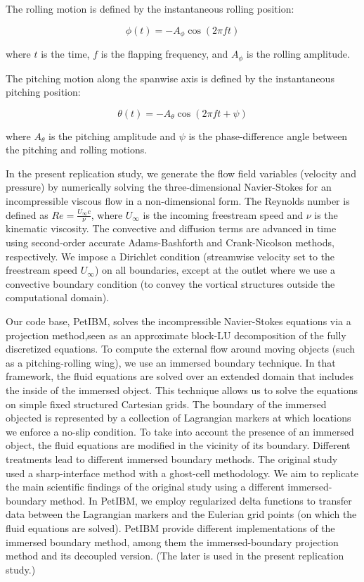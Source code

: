 The rolling motion is defined by the instantaneous rolling position:

\begin{equation}
  \phi (t) = -A_\phi \cos \left( 2 \pi f t \right)
\end{equation}

where $t$ is the time, $f$ is the flapping frequency, and $A_\phi$ is the rolling amplitude.

The pitching motion along the spanwise axis is defined by the instantaneous pitching position:

\begin{equation}
  \theta (t) = -A_\theta \cos(2 \pi f t + \psi)
\end{equation}

where $A_\theta$ is the pitching amplitude and $\psi$ is the phase-difference angle between the pitching and rolling motions.

In the present replication study, we generate the flow field variables (velocity and pressure) by numerically solving the three-dimensional Navier-Stokes for an incompressible viscous flow in a non-dimensional form.
The Reynolds number is defined as $Re = \frac{U_\infty c}{\nu}$, where $U_\infty$ is the incoming freestream speed and $\nu$ is the kinematic viscosity.
The convective and diffusion terms are advanced in time using second-order accurate Adams-Bashforth and Crank-Nicolson methods, respectively.
We impose a Dirichlet condition (streamwise velocity set to the freestream speed $U_\infty$) on all boundaries, except at the outlet where we use a convective boundary condition (to convey the vortical structures outside the computational domain).

Our code base, PetIBM, solves the incompressible Navier-Stokes equations via a projection method,seen as an approximate block-LU decomposition of the fully discretized equations.\supercite{perot_1993}
To compute the external flow around moving objects (such as a pitching-rolling wing), we use an immersed boundary technique.
In that framework, the fluid equations are solved over an extended domain that includes the inside of the immersed object.
This technique allows us to solve the equations on simple fixed structured Cartesian grids.
The boundary of the immersed objected is represented by a collection of Lagrangian markers at which locations we enforce a no-slip condition.
To take into account the presence of an immersed object, the fluid equations are modified in the vicinity of its boundary.
Different treatments lead to different immersed boundary methods.
The original study used a sharp-interface method with a ghost-cell methodology.\supercite{mittal_et_al_2008}
We aim to replicate the main scientific findings of the original study using a different immersed-boundary method.
In PetIBM, we employ regularized delta functions to transfer data between the Lagrangian markers and the Eulerian grid points (on which the fluid equations are solved).
PetIBM provide different implementations of the immersed boundary method, among them the immersed-boundary projection method\supercite{taira_colonius_2007} and its decoupled version.\supercite{li_et_al_2016}
(The later is used in the present replication study.)

